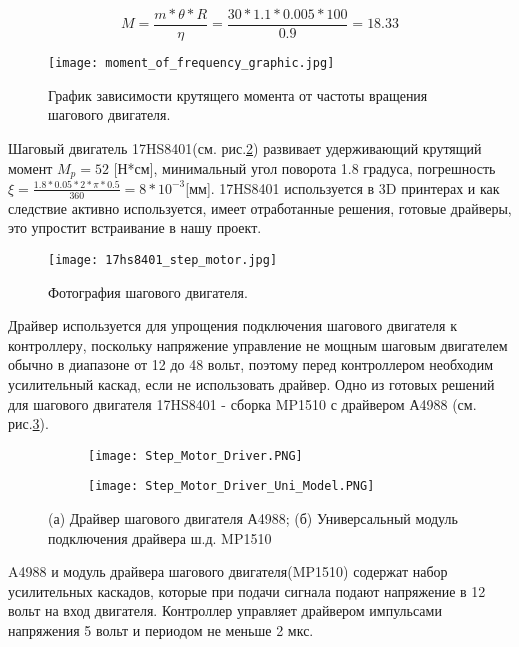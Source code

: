 \begin{equation}
\label{eq:moment}
M=\frac{m*\theta*R}{\eta}= \frac{30*1.1*0.005*100}{0.9}=18.33
\end{equation}

\begin{figure}[ht]
	\centering
     \texttt{[image: moment\_of\_frequency\_graphic.jpg]}
	\caption{График зависимости крутящего момента от частоты вращения шагового двигателя.}
	\label{fig:MomentFrequency}
\end{figure}

Шаговый двигатель 17HS8401(см. рис.\ref{fig:17hs8401_step_motor}) развивает удерживающий крутящий момент $M_{p}=52$ [Н*см], минимальный угол поворота 1.8 градуса, погрешность $\xi=\frac{1.8*0.05*2*\pi*0.5}{360}=8*10^{-3} $[мм]. 17HS8401 используется в 3D принтерах и как следствие активно используется, имеет отработанные решения, готовые драйверы, это упростит встраивание в нашу проект.

\begin{figure}[ht]
	\centering
     \texttt{[image: 17hs8401\_step\_motor.jpg]}
	\caption{Фотография шагового двигателя.}
	\label{fig:17hs8401_step_motor}
\end{figure}
Драйвер используется для упрощения подключения шагового двигателя к контроллеру, поскольку напряжение управление не мощным шаговым двигателем обычно в диапазоне от 12 до 48 вольт, поэтому перед контроллером необходим усилительный каскад, если не использовать драйвер. Одно из готовых решений для шагового двигателя 17HS8401 - сборка MP1510 с драйвером А4988 (см. рис.\ref{fig:Step_Motor_Driver}).
\begin{figure}[h]
    \centering
    \begin{subfigure}[b]{0.45\textwidth}
    \centering
        \texttt{[image: Step\_Motor\_Driver.PNG]}
        \caption{}
    \end{subfigure}
    \begin{subfigure}[b]{0.45\textwidth}
    \centering
        \texttt{[image: Step\_Motor\_Driver\_Uni\_Model.PNG]}
        \caption{}
    \end{subfigure}
    \caption{(а) Драйвер шагового двигателя А4988;
    (б) Универсальный модуль подключения драйвера ш.д. MP1510}
    \label{fig:Step_Motor_Driver}
\end{figure}
A4988 и модуль драйвера шагового двигателя(MP1510) содержат набор усилительных каскадов, которые при подачи сигнала подают напряжение в 12 вольт на вход двигателя. Контроллер управляет драйвером импульсами напряжения 5 вольт и периодом не меньше 2 мкс.


